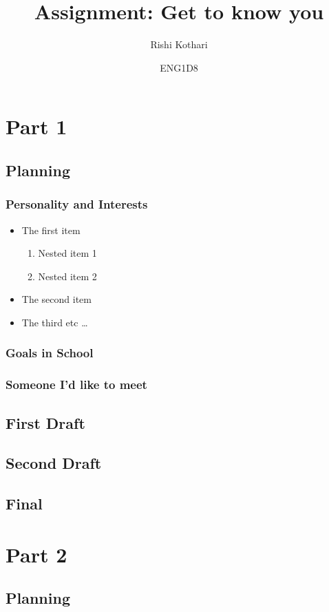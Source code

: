 \documentclass[]{article}
\title{\Huge Assignment: \textbf{Get to know you}}
\author{\LARGE Rishi Kothari}
\date{ENG1D8}
\begin{document}
\maketitle

\newpage


\section*{Part 1}
\subsection*{Planning}
\subsubsection*{Personality and Interests}

\begin{itemize}
    \item The first item
    \begin{enumerate}
    \item Nested item 1
    \item Nested item 2
    \end{enumerate}
    \item The second item
    \item The third etc \ldots
    \end{itemize}
\subsubsection*{Goals in School}
\subsubsection*{Someone I'd like to meet}

\subsection*{First Draft}
\subsection*{Second Draft}
\newpage
\subsection*{Final}

\section*{Part 2}
\subsection*{Planning}
\end{document}
